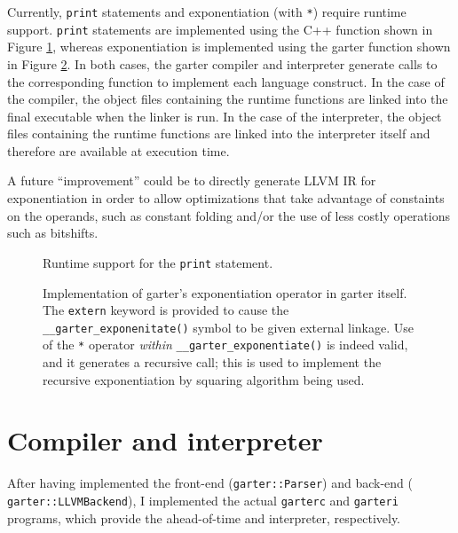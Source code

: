 \documentclass[11pt]{article}
\begin{document}
\label{sec:runtime}

Currently, {\tt print} statements and exponentiation (with {\tt **}) require
runtime support.  {\tt print} statements are implemented using the C++ function
shown in Figure \ref{fig:print}, whereas exponentiation is implemented using the
garter function shown in Figure \ref{fig:exponentiate}.  In both cases, the
garter compiler and interpreter generate calls to the corresponding function to
implement each language construct.  In the case of the compiler, the object
files containing the runtime functions are linked into the final executable when
the linker is run.  In the case of the interpreter, the object files containing
the runtime functions are linked into the interpreter itself and therefore are
available at execution time.

A future ``improvement'' could be to directly generate LLVM IR for
exponentiation in order to allow optimizations that take advantage of constaints
on the operands, such as constant folding and/or the use of less costly
operations such as bitshifts.

\begin{figure}
    \lstset{language=C++}
    \lstset{numbers=left}
    
    \caption{Runtime support for the {\tt print} statement.}
    \label{fig:print}
\end{figure}

\begin{figure}
    \lstset{numbers=left}
    
    \caption{Implementation of garter's exponentiation operator in garter itself.
        The {\tt extern} keyword is provided to cause the {\tt
        \_\_garter\_exponenitate()} symbol to be given external linkage.  Use of
        the {\tt **} operator {\em within} {\tt \_\_garter\_exponentiate()} is
        indeed valid, and it generates a recursive call; this is used to
        implement the recursive exponentiation by squaring algorithm being used.
    }
    \label{fig:exponentiate}
\end{figure}

\section{Compiler and interpreter}

After having implemented the front-end ({\tt garter::Parser}) and back-end ({\tt
garter::LLVMBackend}), I implemented the actual {\tt garterc} and {\tt garteri}
programs, which provide the ahead-of-time and interpreter, respectively.
\end{document}
